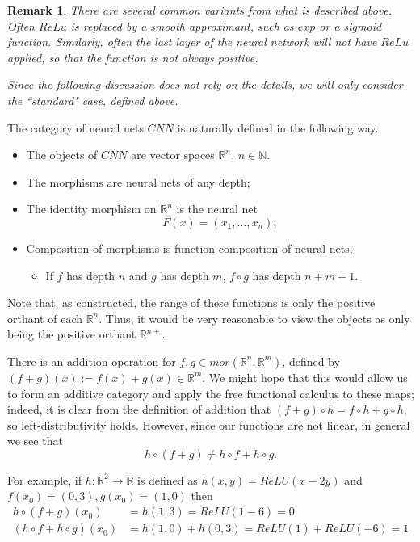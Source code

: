 \documentclass[12pt]{amsart}
\newtheorem{remark}{Remark}[theorem]
\theoremstyle{definition}
\numberwithin{equation}{section}
\begin{document}
\begin{remark}
    There are several common variants from what is described above. Often  $ReLu$ is replaced by a smooth approximant, such as $exp$ or a sigmoid function. Similarly, often the last layer of the neural network will not have $ReLu$ applied, so that the function is not always positive. 

    Since the following discussion does not rely on the details, we will only consider the ``standard" case, defined above. 
\end{remark}

The category of neural nets $CNN$ is naturally defined in the following way. 

\begin{itemize}
    \item The objects of $CNN$ are vector spaces $\mathbb R^n$, $n\in \mathbb N$.
    \item The morphisms are neural nets of any depth; 
    \item The identity morphism on $\mathbb R^{n}$ is the neural net \[F(x) = (x_1, \dots, x_n);\]
    \item Composition of morphisms is function composition of neural nets; 
    \begin{itemize}
        \item If $f$ has depth $n$ and $g$ has depth $m$, $f\circ g$ has depth $n+m+1$.
    \end{itemize}
\end{itemize}

Note that, as constructed, the range of these functions is only the positive orthant of each $\mathbb R^n$. Thus, it would be very reasonable to view the objects as only being the positive orthant $\mathbb R^{n+}$. 

There is an addition operation for $ f, g \in mor(\mathbb R^n, \mathbb R^m)$, defined by $(f+g)(x) := f(x)+g(x) \in \mathbb R^m$. We might hope that this would allow us to form an additive category and apply the free functional calculus to these maps; indeed, it is clear from the definition of addition that $(f+g)\circ h = f\circ h+g\circ h,$ so left-distributivity holds. However, since our functions are not linear, in general we see that \[h\circ (f+g) \neq h\circ f+h\circ g.\]

For example, if $h: \mathbb R^2\rightarrow \mathbb R$ is defined as $h(x, y) = ReLU(x-2y)$ and $f(x_0) = (0,3), g(x_0) = (1, 0)$ then \[\begin{split}h\circ (f+g)(x_0) &= h(1,3)= ReLU(1-6) = 0\\ (h\circ f + h\circ g)(x_0) &= h(1,0)+h(0,3) = ReLU(1)+ ReLU(-6)  = 1
\end{split}\]
\end{document}
